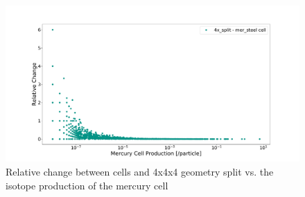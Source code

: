 \begin{figure}[h!]
 \centering
 \includegraphics[scale=0.42,trim={3cm 0.5cm 3cm 3cm},clip]{../figs/toy_p2/prod_VPII_rc_4x_split.pdf}
 \caption{Relative change between cells and 4x4x4 geometry split vs. the isotope production of the mercury cell}
 \label{fig:2prod_cell_4x_rc}
\end{figure}
%

